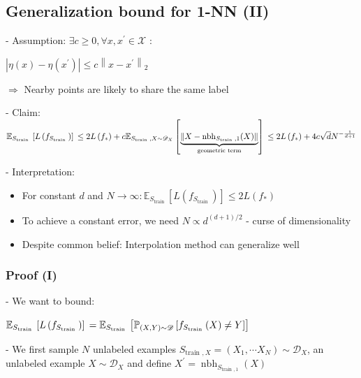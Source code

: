 \subsection*{Generalization bound for 1-NN (II)}

- Assumption: $\exists c \geq 0, \forall x, x^{\prime} \in \mathscr{X}$ :

$
\left|\eta(x)-\eta\left(x^{\prime}\right)\right| \leq c\left\|x-x^{\prime}\right\|_{2}
$

$\Rightarrow$ Nearby points are likely to share the same label

- Claim:
$
\mathbb{E}_{S_{\text {train }}}\left[L\left(f_{S_{\text {train }}}\right)\right] 
\\\leq 2 L\left(f_*\right) +c \mathbb{E}_{S_{\text {train }}, X \sim \mathscr{D}_X}\left[\underbrace{\left\|X-\operatorname{nbh}_{S_{\text {train }}, 1}(X)\right\|}_{\text{geometric term}}\right] 
\\\leq 2 L\left(f_{*}\right)+4 c \sqrt{d} N^{-\frac{1}{d+1}}
$



- Interpretation:
\begin{itemize}
    \item For constant $d$ and $N \rightarrow \infty: \mathbb{E}_{S_{\text {train }}}\left[L\left(f_{S_{\text {train }}}\right)\right] \leq 2 L\left(f_{*}\right)$
    \item To achieve a constant error, we need $N \propto d^{(d+1) / 2}$ - curse of dimensionality
    \item Despite common belief: Interpolation method can generalize well
\end{itemize}


\subsubsection*{Proof (I)}
- We want to bound:

$
\mathbb{E}_{S_{\text {train }}}\left[L\left(f_{S_{\text {train }}}\right)\right]\\=\mathbb{E}_{S_{\text {train }}}\left[\mathbb{P}_{(X, Y) \sim \mathscr{D}}\left[f_{S_{\text {train }}}(X) \neq Y\right]\right]
$

- We first sample $N$ unlabeled examples $S_{\text {train }, X}=\left(X_{1}, \cdots X_{N}\right) \sim \mathscr{D}_{X}$, an unlabeled example $X \sim \mathscr{D}_{X}$ and define $X^{\prime}=\operatorname{nbh}_{S_{\text {train }, 1}}(X)$

